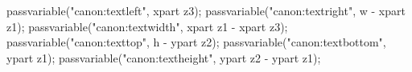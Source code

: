 		passvariable("canon:textleft",   xpart z3);
		passvariable("canon:textright",  w - xpart z1);
		passvariable("canon:textwidth",  xpart z1 - xpart z3);
		passvariable("canon:texttop",    h - ypart z2);
		passvariable("canon:textbottom", ypart z1);
		passvariable("canon:textheight", ypart z2 - ypart z1);
	\stopMPcalculation

	\setuplayout[
		header=\bodyfontsize,
		headerdistance=\bodyfontsize, %
		top=0pt,
		topspace=\dimexpr\MPrunvar{canon:texttop}bp-\headerheight-\headerdistance\relax,
		footer=0pt,
		footerdistance=0pt,
		height=\dimexpr\MPrunvar{canon:textheight}bp
			+\headerheight+\headerdistance
			+\footerheight+\footerdistance\relax,
		backspace=\MPrunvar{canon:textleft}bp,
		margin=0pt, %
		width=\MPrunvar{canon:textwidth}bp,
	]

\stopenvironment

